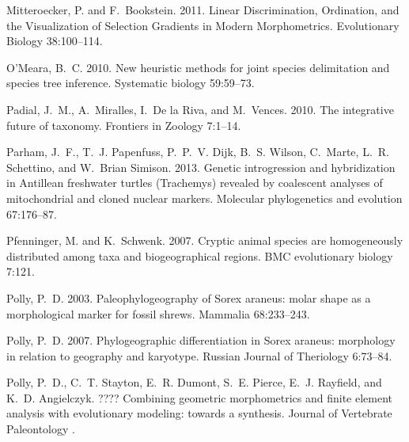 \documentclass[12pt,letterpaper]{article}
\begin{document}
\begin{thebibliography}{77}
Mitteroecker, P. and F.~Bookstein. 2011. {Linear Discrimination, Ordination,
  and the Visualization of Selection Gradients in Modern Morphometrics}.
  Evolutionary Biology 38:100--114.

O'Meara, B.~C. 2010. {New heuristic methods for joint species delimitation and
  species tree inference.} Systematic biology 59:59--73.

Padial, J.~M., A.~Miralles, I.~{De la Riva}, and M.~Vences. 2010. {The
  integrative future of taxonomy}. Frontiers in Zoology 7:1--14.

Parham, J.~F., T.~J. Papenfuss, P.~P.~V. Dijk, B.~S. Wilson, C.~Marte, L.~R.
  Schettino, and W.~{Brian Simison}. 2013. {Genetic introgression and
  hybridization in Antillean freshwater turtles (Trachemys) revealed by
  coalescent analyses of mitochondrial and cloned nuclear markers.} Molecular
  phylogenetics and evolution 67:176--87.

Pfenninger, M. and K.~Schwenk. 2007. {Cryptic animal species are homogeneously
  distributed among taxa and biogeographical regions.} BMC evolutionary biology
  7:121.

Polly, P.~D. 2003. {Paleophylogeography of Sorex araneus: molar shape as a
  morphological marker for fossil shrews}. Mammalia 68:233--243.

Polly, P.~D. 2007. {Phylogeographic differentiation in Sorex araneus:
  morphology in relation to geography and karyotype}. Russian Journal of
  Theriology 6:73--84.

Polly, P.~D., C.~T. Stayton, E.~R. Dumont, S.~E. Pierce, E.~J. Rayfield, and
  K.~D. Angielczyk. ???? {Combining geometric morphometrics and finite element
  analysis with evolutionary modeling: towards a synthesis}. Journal of
  Vertebrate Paleontology .


\end{thebibliography}
\end{document}
